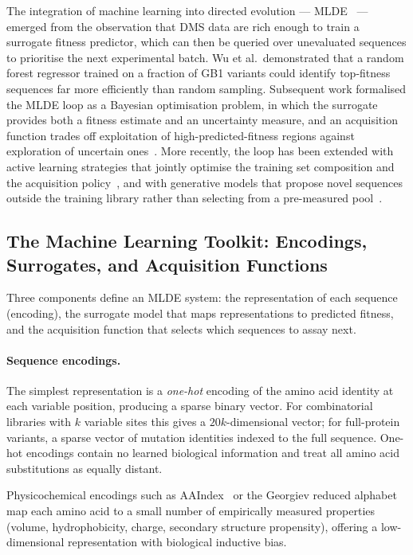 \documentclass[english, 12pt, a4paper, elec, utf8, a-2b, online]{aaltothesis}
\begin{document}
The integration of machine learning into directed evolution --- MLDE~\cite{Wu2019} --- emerged
from the observation that DMS data are rich enough to train a surrogate fitness predictor,
which can then be queried over unevaluated sequences to prioritise the next experimental batch.
Wu et al.\ demonstrated that a random forest regressor trained on a fraction of GB1 variants
could identify top-fitness sequences far more efficiently than random sampling.
Subsequent work formalised the MLDE loop as a Bayesian optimisation problem,
in which the surrogate provides both a fitness estimate and an uncertainty measure,
and an acquisition function trades off exploitation of high-predicted-fitness regions
against exploration of uncertain ones~\cite{Romero2009, Yang2025}.
More recently, the loop has been extended with active learning strategies that jointly optimise
the training set composition and the acquisition policy~\cite{Yang2025},
and with generative models that propose novel sequences outside the training library
rather than selecting from a pre-measured pool~\cite{Stanton2022}.

\subsection{The Machine Learning Toolkit: Encodings, Surrogates, and Acquisition Functions}
\label{sec:litrev:methods}

Three components define an MLDE system: the representation of each sequence (encoding),
the surrogate model that maps representations to predicted fitness,
and the acquisition function that selects which sequences to assay next.

\paragraph{Sequence encodings.}
The simplest representation is a \emph{one-hot} encoding of the amino acid identity at each
variable position, producing a sparse binary vector.
For combinatorial libraries with $k$ variable sites this gives a $20k$-dimensional vector;
for full-protein variants, a sparse vector of mutation identities indexed to the full sequence.
One-hot encodings contain no learned biological information and treat all amino acid substitutions
as equally distant.

Physicochemical encodings such as AAIndex~\cite{Kawashima2000} or the Georgiev reduced
alphabet~\cite{Georgiev2009} map each amino acid to a small number of empirically measured
properties (volume, hydrophobicity, charge, secondary structure propensity), offering
a low-dimensional representation with biological inductive bias.
\end{document}

